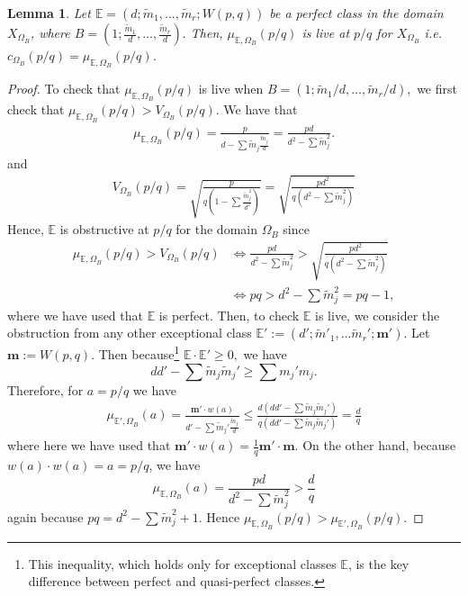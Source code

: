 \documentclass[11pt, reqno]{amsart}
\newtheorem{lemma}[thm]{Lemma}
\theoremstyle{remark}
\numberwithin{equation}{subsection}
\numberwithin{figure}{section}
\theoremstyle{customremark}
\newcommand{\Tm}{{\widetilde m}}
\newcommand{\bE}{{\mathbb E}}
\newcommand{\Om}{{\Omega}}
\begin{document}
\begin{lemma} \label{lem:unobs}
Let $\bE=(d;\widetilde{m}_1,\hdots,\widetilde{m}_r;W(p,q))$ be a perfect class in the domain $X_{\Om_B}$, where 
$B=(1;\frac{\Tm_1}{d},\hdots,\frac{\Tm_r}{d}).$
Then, $\mu_{\bE,\Om_B}(p/q)$ is live at $p/q$ for $X_{\Om_B}$ %
i.e. $c_{\Om_B}(p/q)=\mu_{\bE,\Om_B}(p/q)$.
\end{lemma}
\begin{proof}
    To check that $\mu_{\bE,\Om_B}(p/q)$ is live when $B=(1;\widetilde{m}_1/d,\hdots,\widetilde{m}_r/d),$ we first check that $\mu_{\bE,\Om_B}(p/q) > V_{\Om_B}(p/q).$
    We have that
    \begin{align*}
       \mu_{\bE,\Om_B}(p/q)=\frac{p}{d-\sum \Tm_j \frac{\Tm_j}{d}}=
       \frac{pd}{d^2-\sum \Tm_j^2}.
    \end{align*}   
    and
    \begin{align*}
        V_{\Om_B}(p/q)=\sqrt{\frac{p}{q(1-\sum \frac{\Tm_j^2}{d^2})}}=\sqrt{\frac{pd^2}{q(d^2-\sum \Tm_j^2)}}
    \end{align*}
    Hence, $\bE$ is obstructive at $p/q$ for the domain $\Om_B$ since
    \begin{align*}
        \mu_{\bE,\Om_B}(p/q) > V_{\Om_B}(p/q) & \iff
        \frac{pd}{d^2-\sum \Tm_j^2} > \sqrt{\frac{pd^2}{q(d^2-\sum \Tm_j^2)}} \\
     &   \iff
       pq> d^2-\sum \Tm_j^2=pq-1,
    \end{align*}
    where  we have used that $\bE$ is perfect. 
    Then, to check $\bE$ is live, we consider the obstruction from any other exceptional class $\bE':=(d';\widetilde{m}'_1,\hdots \widetilde{m}_r';\bm{m}')$. Let $\bm{m}:=W(p,q)$.  Then because\footnote
    {
    This inequality, which holds only for exceptional classes $\bE$,  is the key difference between perfect and quasi-perfect classes.} $\bE \cdot \bE' \geq 0,$ we have
    \[ dd'-\sum \widetilde{m}_j \widetilde{m}_j' \geq \sum m_j' m_j .\]  
    Therefore, for $a=p/q$ we have
    \begin{align*}
    \mu_{\bE',\Om_B}(a)=\frac{\bm{m}' \cdot w(a)}{d'-\sum \Tm_j'\frac{\Tm_j}{d}} 
 \leq \frac{d(dd'-\sum \Tm_j\Tm_j')}{q(dd'-\sum \Tm_j \Tm_j')}=\frac{d}{q}
    \end{align*}  
    where here we have used that $\bm{m}' \cdot w(a)=\frac{1}{q}\bm{m}' \cdot \bm{m}$.
On the other hand, because $w(a)\cdot w(a)=a=p/q$, we have
\[ \mu_{\bE,\Om_B}(a)=\frac{pd}{d^2-\sum \Tm_j^2} > \frac{d}{q}\]
again because $pq=d^2-\sum \Tm_j^2+1.$ 
Hence $\mu_{\bE,\Om_B}(p/q) > \mu_{\bE',\Om_B}(p/q)$.
\end{proof}
\end{document}
